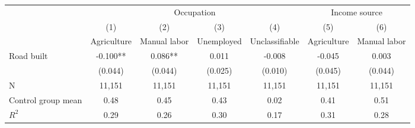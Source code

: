 {
\def\sym#1{\ifmmode^{#1}\else\(^{#1}\)\fi}
\begin{tabular}{l*{6}{c}}
\hline\hline
                         &\multicolumn{4}{c}{Occupation}                                 &\multicolumn{2}{c}{Income source}\\\cmidrule(lr){2-5}\cmidrule(lr){6-7}
                         &\multicolumn{1}{c}{(1)}&\multicolumn{1}{c}{(2)}&\multicolumn{1}{c}{(3)}&\multicolumn{1}{c}{(4)}&\multicolumn{1}{c}{(5)}&\multicolumn{1}{c}{(6)}\\
                         &\multicolumn{1}{c}{Agriculture}&\multicolumn{1}{c}{Manual labor}&\multicolumn{1}{c}{Unemployed}&\multicolumn{1}{c}{Unclassifiable}&\multicolumn{1}{c}{Agriculture}&\multicolumn{1}{c}{Manual labor}\\
\hline
Road built               &      -0.100** &       0.086** &       0.011   &      -0.008   &      -0.045   &       0.003   \\
                         &     (0.044)   &     (0.044)   &     (0.025)   &     (0.010)   &     (0.045)   &     (0.044)   \\
\hline
N                        &      11,151   &      11,151   &      11,151   &      11,151   &      11,151   &      11,151   \\
Control group mean       &        0.48   &        0.45   &        0.43   &        0.02   &        0.41   &        0.51   \\
$ R^{2} $                &        0.29   &        0.26   &        0.30   &        0.17   &        0.31   &        0.28   \\
\hline\hline
\end{tabular}
}
